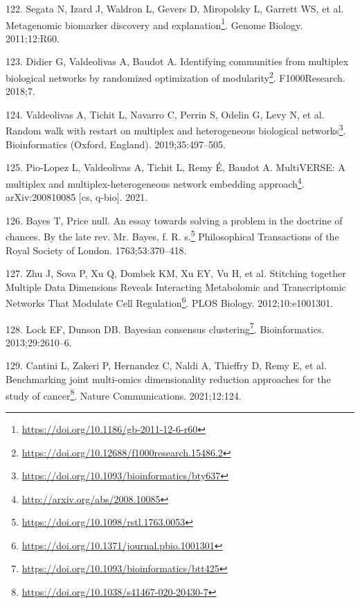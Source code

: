 \documentclass[
  12pt,
  a4paper,
  twoside,
  openright]{book}
\DeclareRobustCommand{\href}[2]{#2\footnote{\url{#1}}}
\newlength{\cslhangindent}
\newlength{\cslentryspacingunit} %
\newenvironment{CSLReferences}[2] %
 {%
  \setlength{\parindent}{0pt}
  \ifodd #1
  \let\oldpar\par
  \def\par{\hangindent=\cslhangindent\oldpar}
  \fi
  \setlength{\parskip}{#2\cslentryspacingunit}
 }%
 {}
\begin{document}
\begin{CSLReferences}{0}{0}
\leavevmode{}%
122. Segata N, Izard J, Waldron L, Gevers D, Miropolsky L, Garrett WS, et al. \href{https://doi.org/10.1186/gb-2011-12-6-r60}{Metagenomic biomarker discovery and explanation}. Genome Biology. 2011;12:R60.

\leavevmode{}%
123. Didier G, Valdeolivas A, Baudot A. \href{https://doi.org/10.12688/f1000research.15486.2}{Identifying communities from multiplex biological networks by randomized optimization of modularity}. F1000Research. 2018;7.

\leavevmode{}%
124. Valdeolivas A, Tichit L, Navarro C, Perrin S, Odelin G, Levy N, et al. \href{https://doi.org/10.1093/bioinformatics/bty637}{Random walk with restart on multiplex and heterogeneous biological networks}. Bioinformatics (Oxford, England). 2019;35:497--505.

\leavevmode{}%
125. Pio-Lopez L, Valdeolivas A, Tichit L, Remy É, Baudot A. \href{http://arxiv.org/abs/2008.10085}{MultiVERSE: A multiplex and multiplex-heterogeneous network embedding approach}. arXiv:200810085 {[}cs, q-bio{]}. 2021.

\leavevmode{}%
126. Bayes T, Price null. \href{https://doi.org/10.1098/rstl.1763.0053}{An essay towards solving a problem in the doctrine of chances. By the late rev. Mr. Bayes, f. R. s.} Philosophical Transactions of the Royal Society of London. 1763;53:370--418.

\leavevmode{}%
127. Zhu J, Sova P, Xu Q, Dombek KM, Xu EY, Vu H, et al. \href{https://doi.org/10.1371/journal.pbio.1001301}{Stitching together Multiple Data Dimensions Reveals Interacting Metabolomic and Transcriptomic Networks That Modulate Cell Regulation}. PLOS Biology. 2012;10:e1001301.

\leavevmode{}%
128. Lock EF, Dunson DB. \href{https://doi.org/10.1093/bioinformatics/btt425}{Bayesian consensus clustering}. Bioinformatics. 2013;29:2610--6.

\leavevmode{}%
129. Cantini L, Zakeri P, Hernandez C, Naldi A, Thieffry D, Remy E, et al. \href{https://doi.org/10.1038/s41467-020-20430-7}{Benchmarking joint multi-omics dimensionality reduction approaches for the study of cancer}. Nature Communications. 2021;12:124.


\end{CSLReferences}
\end{document}
